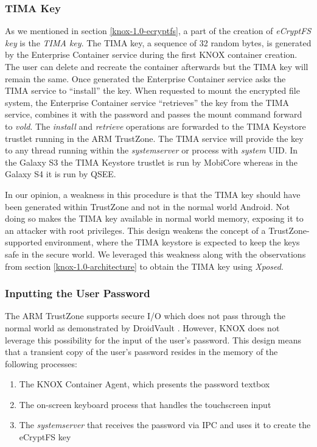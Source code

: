 \documentclass[11pt]{article}
\begin{document}
\subsubsection{TIMA Key} \label{knox-1.0-tima-key}
As we mentioned in section \ref{knox-1.0-ecryptfs}, a part of the creation of \emph{eCryptFS key} is the \emph{TIMA key}.
The TIMA key, a sequence of 32 random bytes, is generated by the Enterprise Container service during the first KNOX container creation. 
The user can delete and recreate the container afterwards but the TIMA key will remain the same.
Once generated the Enterprise Container service asks the TIMA service to ``install'' the key.
When requested to mount the encrypted file system, the Enterprise Container service ``retrieves'' the key from the TIMA service, combines it with
the password and passes the mount command forward to \emph{vold}.
The \emph{install} and \emph{retrieve} operations are forwarded to the TIMA Keystore trustlet running in the ARM TrustZone. 
The TIMA service will provide the key to any thread running within the \emph{system\textunderscore server} or process with \emph{system} UID.
In the Galaxy S3 the TIMA Keystore trustlet is run by MobiCore whereas in the Galaxy S4 it is run by QSEE. 

In our opinion, a weakness in this procedure is that the TIMA key should have been generated within TrustZone and not in the normal world Android.
Not doing so makes the TIMA key available in normal world memory, exposing it to an attacker with root privileges. 
This design weakens the concept of a TrustZone-supported environment, where the TIMA keystore is expected to keep the 
keys safe in the secure world. 
We leveraged this weakness along with the observations from section \ref{knox-1.0-architecture} 
to obtain the TIMA key using \emph{Xposed}. 

\subsubsection{Inputting the User Password} \label{input-user-password}
The ARM TrustZone supports secure I/O which does not pass through the normal world as demonstrated by DroidVault \cite{DroidVault}. 
However, KNOX does not leverage this possibility for the input of the user's password.
This design means that a transient copy of the user's password resides in the memory of the following processes:
\begin{enumerate}[itemsep=0pt]
\item The KNOX Container Agent, which presents the password textbox
\item The on-screen keyboard process that handles the touchscreen input
\item The \emph{system\textunderscore server} that receives the password via IPC and uses it to create the eCryptFS key
\end{enumerate}
\end{document}
